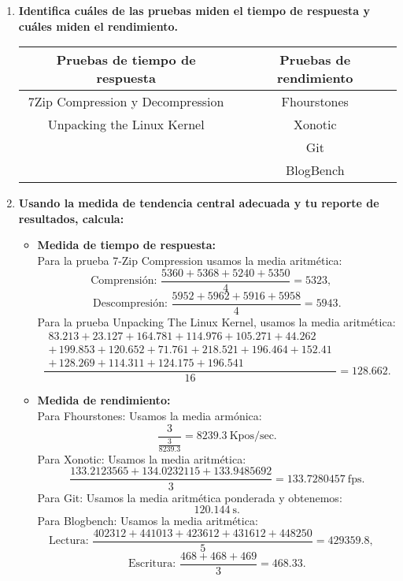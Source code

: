 \documentclass[12pt]{article}
\newcommand{\pl}[1]{\item \textbf{ #1 }}
\begin{document}
\begin{enumerate}[label=(\arabic{section}.\arabic{subsection}.\arabic{enumi})]
    \pl{Identifica cuáles de las pruebas miden el tiempo de respuesta y cuáles miden el rendimiento.}
    \begin{table}[htb]
        \centering
        \begin{tabular}{|c|c|}
        \hline
        Pruebas de tiempo de respuesta & Pruebas de rendimiento \\
        \hline
        7Zip Compression y Decompression & Fhourstones \\
        \hline
        Unpacking the Linux Kernel & Xonotic \\
        \hline
         & Git \\
        \hline
        & BlogBench \\
        \hline
        \end{tabular}
    \end{table}\par

    \pl{Usando la medida de tendencia central adecuada y tu reporte de resultados, calcula:}
    \begin{itemize}
       \item \textbf{Medida de tiempo de respuesta:} \\
       Para la prueba 7-Zip Compression usamos la media aritmética:
       \[
       \text{Comprensión: } \frac{5360+5368+5240+5350}{4}=5323,\quad
       \]
       \[
       \text{Descompresión: } \frac{5952+5962+5916+5958}{4}=5943.
       \]
       Para la prueba Unpacking The Linux Kernel, usamos la media aritmética:
       \[
       \frac{
       	\begin{split}
       		83.213 + 23.127 + 164.781 + 114.976 + 105.271 + 44.262 \\
       		+\, 199.853 + 120.652 + 71.761 + 218.521 + 196.464 + 152.41 \\
       		+\, 128.269 + 114.311 + 124.175 + 196.541
       	\end{split}
       }{16} = 128.662.
       \]
       
       \item \textbf{Medida de rendimiento:} \\
       Para Fhourstones: Usamos la media armónica:
       \[
       \frac{3}{\frac{3}{8239.3}} = 8239.3\ \text{Kpos/sec}.
       \]
       Para Xonotic: Usamos la media aritmética:
       \[
       \frac{133.2123565+134.0232115+133.9485692}{3}=133.7280457\ \text{fps}.
       \]
       Para Git: Usamos la media aritmética ponderada y obtenemos:
       \[
       120.144\ \text{s}.
       \]
       Para Blogbench: Usamos la media aritmética:
       \[
       \text{Lectura: } \frac{402312+441013+423612+431612+448250}{5}=429359.8,\quad
       \]
       \[
       \text{Escritura: } \frac{468+468+469}{3}=468.33.
       \]
       \end{itemize}


\end{enumerate}
\end{document}
